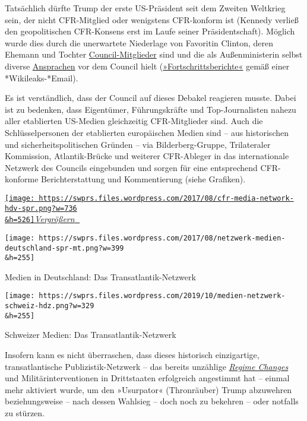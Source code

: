 Tatsächlich dürfte Trump der erste US-Präsident seit dem Zweiten
Weltkrieg sein, der nicht CFR-Mitglied oder wenigstens CFR-konform ist
(Kennedy verließ den geopolitischen CFR-Konsens erst im Laufe seiner
Präsidentschaft). Möglich wurde dies durch die unerwartete Niederlage
von Favoritin Clinton, deren Ehemann und Tochter
\href{https://swprs.files.wordpress.com/2017/07/cfr-members-2016.pdf}{Council-Mitglieder}
sind und die als Außenministerin selbst diverse
\href{https://www.youtube.com/watch?v=Kfpgl6NqF0I}{Ansprachen} vor dem
Council hielt
(\href{https://www.wikileaks.org/clinton-emails/emailid/7006}{»Fortschrittsberichte«}
gemäß einer *Wikileaks-*Email).

Es ist verständlich, dass der Council auf dieses Debakel reagieren
musste. Dabei ist zu bedenken, dass Eigentümer, Führungskräfte und
Top-Journalisten nahezu aller etablierten US-Medien gleichzeitig
CFR-Mitglieder sind. Auch die Schlüsselpersonen der etablierten
europäischen Medien sind -- aus historischen und sicherheitspolitischen
Gründen -- via Bilderberg-Gruppe, Trilateraler Kommission,
Atlantik-Brücke und weiterer CFR-Ableger in das internationale Netzwerk
des Councils eingebunden und sorgen für eine entsprechend CFR-konforme
Berichterstattung und Kommentierung (siehe Grafiken).

\href{https://swprs.files.wordpress.com/2017/08/cfr-media-network-hdv-spr.png}{\texttt{[image: https://swprs.files.wordpress.com/2017/08/cfr-media-network-hdv-spr.png?w=736\\\&h=526]}\emph{Vergrößern}
🔎}

\href{https://swprs.files.wordpress.com/2017/08/netzwerk-medien-deutschland-spr-mt.png}{}

\texttt{[image: https://swprs.files.wordpress.com/2017/08/netzwerk-medien-deutschland-spr-mt.png?w=399\\\&h=255]}

Medien in Deutschland: Das Transatlantik-Netzwerk

\href{https://swprs.files.wordpress.com/2019/10/medien-netzwerk-schweiz-hdz.png}{}

\texttt{[image: https://swprs.files.wordpress.com/2019/10/medien-netzwerk-schweiz-hdz.png?w=329\\\&h=255]}

Schweizer Medien: Das Transatlantik-Netzwerk

Insofern kann es nicht überraschen, dass dieses historisch einzigartige,
transatlantische Publizistik-Netz­werk -- das bereits unzählige
\emph{\href{https://www.amazon.com/Killing-Hope-Military-Interventions-Updated/dp/1783601779}{Regime
Changes}} und Militärinterventionen in Drittstaaten erfolgreich
angestimmt hat -- einmal mehr aktiviert wurde, um den »Usurpator«
(Thronräuber) Trump abzuwehren beziehungsweise -- nach dessen Wahlsieg
-- doch noch zu bekehren -- oder notfalls zu stürzen.

